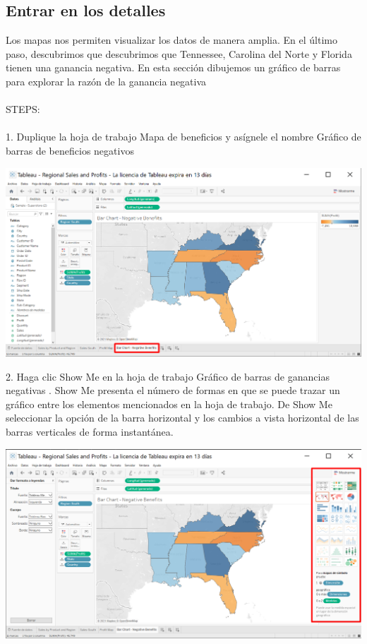 \documentclass[12pt,letterpaper]{article}
\begin{document}
\subsection{Entrar en los detalles}
Los mapas nos permiten visualizar los datos de manera amplia. En el último paso,
descubrimos que descubrimos que Tennessee, Carolina del Norte y Florida tienen una
ganancia negativa. En esta sección dibujemos un gráfico de barras para explorar la
razón de la ganancia negativa
\\\\STEPS:
\\\\1. Duplique la hoja de trabajo Mapa de beneficios y asígnele el nombre Gráfico de barras de
beneficios negativos
\begin{center}
    \includegraphics[width=16cm]{img/27.png}  
\end{center}
2. Haga clic Show Me en la hoja de trabajo Gráfico de barras de ganancias negativas . Show
Me presenta el número de formas en que se puede trazar un gráfico entre los elementos 
mencionados en la hoja de trabajo. De Show Me seleccionar la opción de la barra horizontal y
los cambios a vista horizontal de las barras verticales de forma instantánea.
\begin{center}
    \includegraphics[width=16cm]{img/28.png}  
\end{center}
\end{document}
